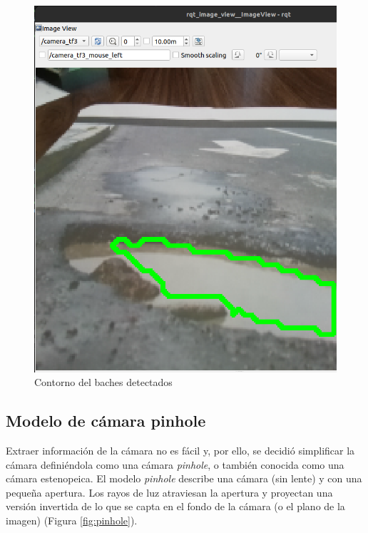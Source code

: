 \begin{figure}[ht!]
\begin{minipage}{0.4\linewidth}
		\includegraphics[width=\linewidth]{figs/cap6/contornobache2.png}
	\end{minipage}
	\caption{Contorno del baches detectados}
	\label{fig:contornobache}
\end{figure}

\subsection{Modelo de cámara pinhole}
\label{subsec:softwarehsuelo}

Extraer información de la cámara no es fácil y, por ello, se decidió simplificar la cámara definiéndola como una cámara \textit{pinhole}, o también conocida como una cámara estenopeica. El modelo \textit{pinhole} describe una cámara (sin lente) y con una pequeña apertura. Los rayos de luz atraviesan la apertura y proyectan una versión invertida de lo que se capta en el fondo de la cámara (o el plano de la imagen) (Figura \ref{fig:pinhole}).

